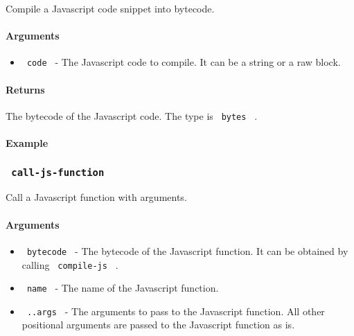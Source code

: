 Compile a Javascript code snippet into bytecode.

\paragraph{Arguments}\label{arguments-1}

\begin{itemize}
\tightlist
\item
  \texttt{\ code\ } - The Javascript code to compile. It can be a string
  or a raw block.
\end{itemize}

\paragraph{Returns}\label{returns-1}

The bytecode of the Javascript code. The type is \texttt{\ bytes\ } .

\paragraph{Example}\label{example-2}

\begin{Shaded}
\begin{Highlighting}[]
\end{Highlighting}
\end{Shaded}

\subsubsection{\texorpdfstring{\texttt{\ call-js-function\ }}{ call-js-function }}\label{call-js-function}

Call a Javascript function with arguments.

\paragraph{Arguments}\label{arguments-2}

\begin{itemize}
\tightlist
\item
  \texttt{\ bytecode\ } - The bytecode of the Javascript function. It
  can be obtained by calling \texttt{\ compile-js\ } .
\item
  \texttt{\ name\ } - The name of the Javascript function.
\item
  \texttt{\ ..args\ } - The arguments to pass to the Javascript
  function. All other positional arguments are passed to the Javascript
  function as is.
\end{itemize}

